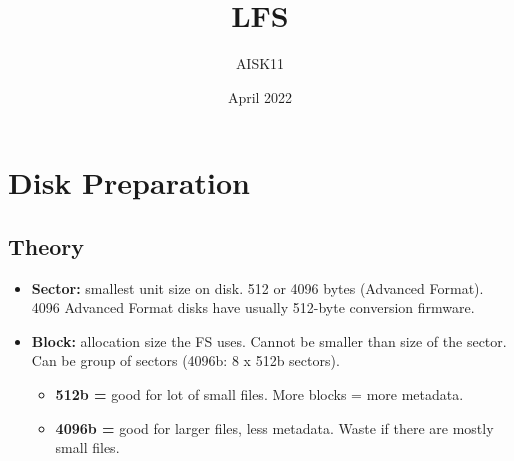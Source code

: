 \documentclass[10pt, a4paper, onecolumn, oneside, titlepage, openany]{book}
\title{\textbf{LFS}}
\author{AISK11}
\date{April 2022}
\begin{document}
\maketitle
\tableofcontents

\chapter{Disk Preparation}
\section{Theory}
\begin{itemize}
    \item \textbf{Sector:} smallest unit size on disk. 512 or 4096 bytes (Advanced Format). 4096 Advanced Format disks have usually 512-byte conversion firmware.
    \item \textbf{Block:} allocation size the FS uses. Cannot be smaller than size of the sector. Can be group of sectors (4096b: 8 x 512b sectors).
    \begin{itemize}
        \item \textbf{512b =} good for lot of small files. More blocks = more metadata.
        \item \textbf{4096b =}  good for larger files, less metadata. Waste if there are mostly small files.
    \end{itemize}
\end{itemize}
\end{document}
